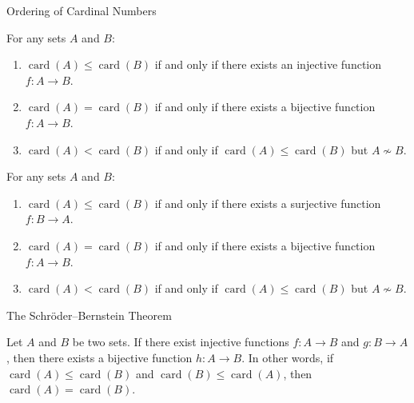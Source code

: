 \documentclass[12pt, a4paper]{article}
\DeclareMathOperator{\card}{card}
\begin{document}
\clearpage

\begin{heading}
	Ordering of Cardinal Numbers
\end{heading}

\vspace{10pt}

\begin{definition}
	For any sets $A$ and $B$:
	\begin{enumerate}
		\item $\card(A) \le \card(B)$ if and only if there exists an injective function $f : A \to B$.
		\item $\card(A) = \card(B)$ if and only if there exists a bijective function $f : A \to B$.
		\item $\card(A) < \card(B)$ if and only if $\card(A) \le \card(B)$ but $A \not\sim B$.
	\end{enumerate}
\end{definition}

\clearpage

\begin{definition}
	For any sets $A$ and $B$:
	\begin{enumerate}
		\item $\card(A) \le \card(B)$ if and only if there exists a surjective function $f : B \to A$.
		\item $\card(A) = \card(B)$ if and only if there exists a bijective function $f : A \to B$.
		\item $\card(A) < \card(B)$ if and only if $\card(A) \le \card(B)$ but $A \not\sim B$.
	\end{enumerate}
\end{definition}

\clearpage

\begin{heading}
	The Schröder–Bernstein Theorem
\end{heading}

\vspace{10pt}

\begin{theorem}
	Let \(A\) and \(B\) be two sets. If there exist injective functions \(f: A \to B\) and \(g: B \to A\), then there exists a bijective function \(h: A \to B\). In other words, if \(\card(A) \leq \card(B)\) and \(\card(B) \leq \card(A)\), then \(\card(A) = \card(B)\).	
\end{theorem}
\end{document}
